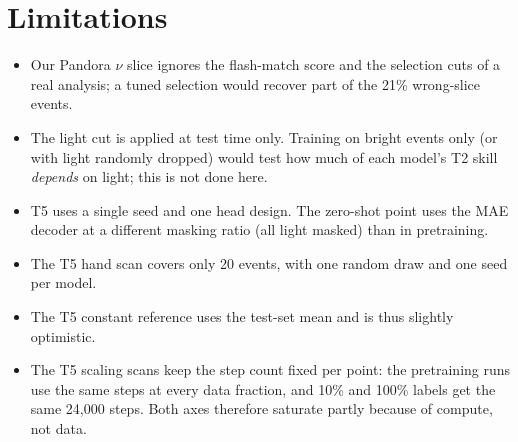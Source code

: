 \documentclass[11pt,a4paper]{article}
\begin{document}
\section{Limitations}
\begin{itemize}[leftmargin=*]
\item Our Pandora $\nu$ slice ignores the flash-match score and the selection cuts of a real analysis; a tuned selection would recover part of the 21\% wrong-slice events.
\item The light cut is applied at test time only. Training on bright events only (or with light randomly dropped) would test how much of each model's T2 skill \emph{depends} on light; this is not done here.
\item T5 uses a single seed and one head design. The zero-shot point uses the MAE decoder at a different masking ratio (all light masked) than in pretraining.
\item The T5 hand scan covers only 20 events, with one random draw and one seed per model.
\item The T5 constant reference uses the test-set mean and is thus slightly optimistic.
\item The T5 scaling scans keep the step count fixed per point: the pretraining runs use the same steps at every data fraction, and 10\% and 100\% labels get the same 24{,}000 steps. Both axes therefore saturate partly because of compute, not data.
\end{itemize}

\end{document}
